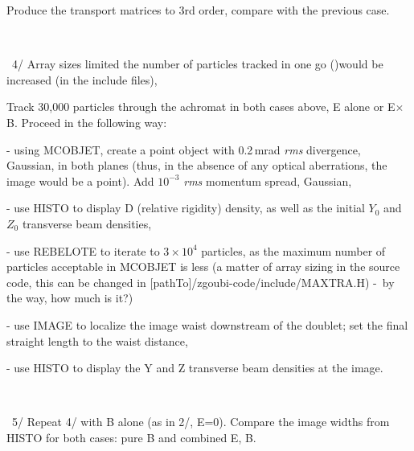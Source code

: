 \documentclass[10pt]{article}
\newcommand{\nin}{\noindent~}
\begin{document}
Produce the transport matrices to 3rd order, compare with the previous case.

~

\nin 4/ Array sizes limited the number of particles tracked in one go ()would be increased (in the include files), 


Track 30,000 particles through the achromat in both cases above, E alone or E$\times$B.
Proceed in the following way:

- using MCOBJET, create a point object with  0.2\,mrad \textsl{rms} divergence, Gaussian, in both planes (thus, in the absence of any optical aberrations, the image would be a point). 
Add $10^{-3}$ \textsl{rms} momentum spread, Gaussian, 

- use HISTO to  display D (relative rigidity) density, as well as the initial $Y_0$ and $Z_0$ transverse beam densities, 

- use REBELOTE to iterate to $3\times 10^4$ particles,  as the maximum number of particles acceptable in MCOBJET is less (a matter of array sizing in the source code, this can be changed in [pathTo]/zgoubi-code/include/MAXTRA.H) -~by the way, how much is it?)

- use IMAGE to localize the image waist downstream of the doublet; set the final straight length to the waist distance,

- use HISTO to display the Y and Z transverse beam densities at the image.

~

\nin 5/ Repeat 4/ with B alone (as in 2/, E=0). Compare the image widths from HISTO for both cases: pure B and combined E, B.
\end{document}
